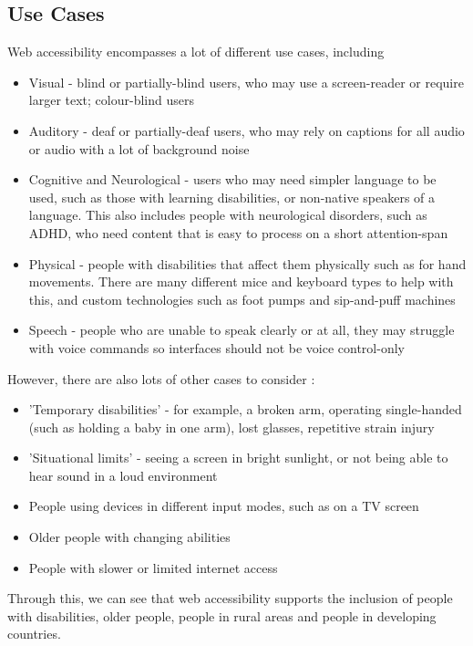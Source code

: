 \documentclass[ %
                    author={Aleena Baig},
                supervisor={Dr Simon Lock},
                    degree={BSc},
                     title={On Making Web Accessible Graphs},
                  subtitle={},
                      year={2019} ]{dissertation}
\begin{document}
\subsection{Use Cases}

Web accessibility encompasses a lot of different use cases, including

\begin{itemize}
    \item Visual - blind or partially-blind users, who may use a screen-reader or require larger text; colour-blind users
    \item Auditory - deaf or partially-deaf users, who may rely on captions for all audio or audio with a lot of background noise
    \item Cognitive and Neurological - users who may need simpler language to be used, such as those with learning disabilities, or non-native speakers of a language. This also includes people with neurological disorders, such as ADHD, who need content that is easy to process on a short attention-span
    \item Physical - people with disabilities that affect them physically such as for hand movements. There are many different mice and keyboard types to help with this, and custom technologies such as foot pumps and sip-and-puff machines
    \item Speech - people who are unable to speak clearly or at all, they may struggle with voice commands so interfaces should not be voice control-only
\end{itemize}

However, there are also lots of other cases to consider :\cite{WAIaccessibilityintro}
%
\begin{itemize}
    \item 'Temporary disabilities' - for example, a broken arm, operating single-handed (such as holding a baby in one arm), lost glasses, repetitive strain injury
    \item 'Situational limits' - seeing a screen in bright sunlight, or not being able to hear sound in a loud environment
    \item People using devices in different input modes, such as on a TV screen
    \item Older people with changing abilities
    \item People with slower or limited internet access
\end{itemize}

Through this, we can see that web accessibility supports the inclusion of people with disabilities, older people, people in rural areas and people in developing countries.
\end{document}
